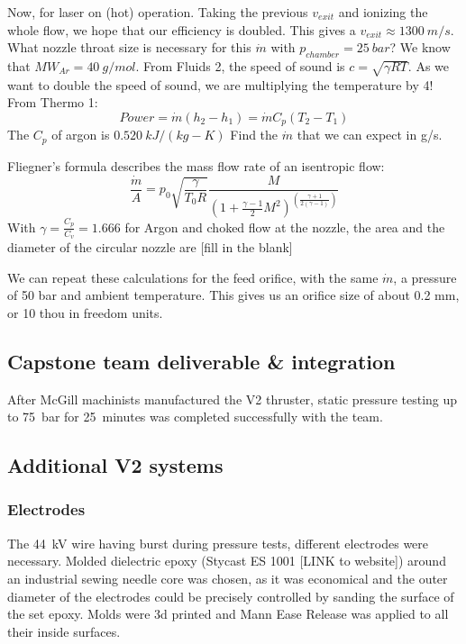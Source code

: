             Now, for laser on (hot) operation. Taking the previous $v_{exit}$ and ionizing the whole flow, we hope that our efficiency is doubled. This gives a $v_{exit}\approx 1300\:m/s$. What nozzle throat size is necessary for this $\dot m$ with $p_{chamber} = 25\: bar$? We know that $MW_{Ar} = 40 \: g/mol$. From Fluids 2, the speed of sound is $c = \sqrt{\gamma R T}$. As we want to double the speed of sound, we are multiplying the temperature by 4! From Thermo 1:
            \[Power = \dot m (h_2-h_1)
            = \dot m C_p (T_2-T_1)\]
            The $C_p$ of argon is $0.520\:kJ/(kg-K)$ Find the $\dot m$ that we can expect in g/s.\vspace{60mm}
            
            Fliegner's formula describes the mass flow rate of an isentropic flow:
            \[\frac{\dot m}{A} = p_0\sqrt{\frac{\gamma}{T_0 R}}\frac{M}{(1+\frac{\gamma-1}{2}M^2)^{(\frac{\gamma+1}{2(\gamma-1)})}}\]
            With $\gamma = \frac{C_p}{C_v} = 1.666$ for Argon and choked flow at the nozzle, the area and the diameter of the circular nozzle are [fill in the blank]
            
            We can repeat these calculations for the feed orifice, with the same $\dot m$, a pressure of 50 bar and ambient temperature. This gives us an orifice size of about 0.2 mm, or 10 thou in freedom units.

        \subsection{Capstone team deliverable & integration}
            
            After McGill machinists manufactured the V2 thruster, static pressure testing up to \qty{75}{bar} for \qty{25}{minutes} was completed successfully with the team. 
        

        \subsection{Additional V2 systems}

            \subsubsection{Electrodes}
                The \qty{44}{kV} wire having burst during pressure tests, different electrodes were necessary. Molded dielectric epoxy (Stycast ES 1001 [LINK to website]) around an industrial sewing needle core was chosen, as it was economical and the outer diameter of the electrodes could be precisely controlled by sanding the surface of the set epoxy. Molds were 3d printed and Mann Ease Release was applied to all their inside surfaces.


